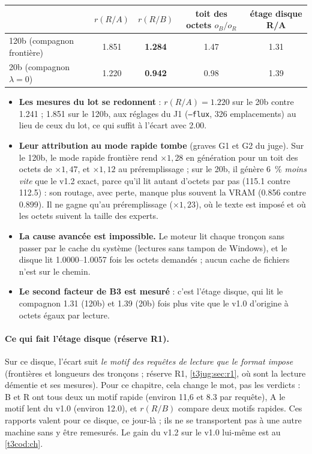 \begin{center}\footnotesize
\begin{tabular}{@{}lcccc@{}}
\toprule
& $r(R/A)$ & $r(R/B)$ & toit des octets $o_B/o_R$ & étage disque R/A \\
\midrule
120b (compagnon frontière) & \num{1.851} & \textbf{\num{1.284}} & \num{1.47} & \num{1.31} \\
20b (compagnon $\lambda = 0$) & \num{1.220} & \textbf{\num{0.942}} & \num{0.98} & \num{1.39} \\
\bottomrule
\end{tabular}
\end{center}

\begin{itemize}
\item \textbf{Les mesures du lot se redonnent} : $r(R/A) = \num{1.220}$ sur le 20b contre \num{1.241} ; \num{1.851} sur le 120b, aux réglages du J1 (\texttt{--flux}, 326 emplacements) au lieu de ceux du lot, ce qui suffit à l'écart avec \num{2.00}.
\item \textbf{Leur attribution au mode rapide tombe} (graves G1 et G2 du juge). Sur le 120b, le mode rapide frontière rend $\times 1{,}28$ en génération pour un toit des octets de $\times 1{,}47$, et $\times 1{,}12$ au préremplissage ; sur le 20b, il génère \SI{6}{\percent} \emph{moins vite} que le v1.2 exact, parce qu'il lit autant d'octets par pas (\SI{115.1}{\Mo} contre \num{112.5}) : son routage, avec perte, manque plus souvent la VRAM (\num{0.856} contre \num{0.899}). Il ne gagne qu'au préremplissage ($\times 1{,}23$), où le texte est imposé et où les octets suivent la taille des experts.
\item \textbf{La cause avancée est impossible.} Le moteur lit chaque tronçon sans passer par le cache du système (lectures sans tampon de Windows), et le disque lit \numrange{1.0000}{1.0057} fois les octets demandés ; aucun cache de fichiers n'est sur le chemin.
\item \textbf{Le second facteur de B3 est mesuré} : c'est l'étage disque, qui lit le compagnon \num{1.31} (120b) et \num{1.39} (20b) fois plus vite que le v1.0 d'origine à octets égaux par lecture.
\end{itemize}

\paragraph{Ce qui fait l'étage disque (réserve R1).} Sur ce disque, l'écart suit \emph{le motif des requêtes de lecture que le format impose} (frontières et longueurs des tronçons ; réserve R1, \cref{t3jug:sec:r1}, où sont la lecture démentie et ses mesures). Pour ce chapitre, cela change le mot, pas les verdicts : B et R ont tous deux un motif rapide (environ 11,6 et \SI{8.3}{\Mo} par requête), A le motif lent du v1.0 (environ \SI{12.0}{\Mo}), et $r(R/B)$ compare deux motifs rapides. Ces rapports valent pour ce disque, ce jour-là ; ils ne se transportent pas à une autre machine sans y être remesurés. Le gain du v1.2 sur le v1.0 lui-même est au \cref{t3cod:ch}.

